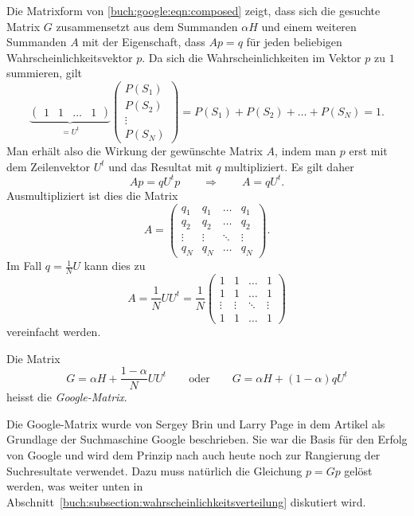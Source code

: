 Die Matrixform von
\eqref{buch:google:eqn:composed}
zeigt, dass sich die gesuchte Matrix $G$ zusammensetzt aus dem Summanden
$\alpha H$ und einem weiteren Summanden $A$ mit der Eigenschaft, dass
$Ap = q$ für jeden beliebigen Wahrscheinlichkeitsvektor $p$.
Da sich die Wahrscheinlichkeiten im Vektor $p$ zu $1$ summieren, gilt
\[
\underbrace{
\begin{pmatrix}
1&1&\dots&1
\end{pmatrix}
}_{\displaystyle = U^t}
\begin{pmatrix}
P(S_1)\\
P(S_2)\\
\vdots\\
P(S_N)
\end{pmatrix}
=
P(S_1)+P(S_2)+\dots+P(S_N)=1.
\]
Man erhält also die Wirkung der gewünschte Matrix $A$, indem man $p$
erst mit dem Zeilenvektor $U^t$ und das Resultat mit $q$ multipliziert.
Es gilt daher
\[
Ap = qU^tp
\qquad\Rightarrow\qquad
A=qU^t.
\]
Ausmultipliziert ist dies die Matrix
\[
A=\begin{pmatrix}
q_1&q_1&\dots&q_1\\
q_2&q_2&\dots&q_2\\
\vdots&\vdots&\ddots&\vdots\\
q_N&q_N&\dots&q_N
\end{pmatrix}.
\]
Im Fall $q=\frac1NU$ kann dies zu
\[
A
=
\frac1N UU^t
=
\frac1N
\begin{pmatrix}
1&1&\dots&1\\
1&1&\dots&1\\
\vdots&\vdots&\ddots&\vdots\\
1&1&\dots&1
\end{pmatrix}
\]
vereinfacht werden.

\begin{definition}
Die Matrix
\begin{equation}
G
=
\alpha H
+
\frac{1-\alpha}{N}
UU^t
\qquad\text{oder}\qquad
G
=
\alpha H
+
(1-\alpha)qU^t
\label{buch:wahrscheinlichkeit:eqn:google-matrix}
\end{equation}
heisst die
{\em Google-Matrix}.
%
\end{definition}

Die Google-Matrix wurde von Sergey Brin und Larry Page 
%
%
in dem Artikel \cite{BRIN1998107} als Grundlage der Suchmaschine
Google beschrieben.
Sie war die Basis für den Erfolg von Google und wird dem Prinzip nach
auch heute noch zur Rangierung der Suchresultate verwendet.
Dazu muss natürlich die Gleichung $p=Gp$ gelöst werden, was
weiter unten in Abschnitt~\ref{buch:subsection:wahrscheinlichkeitsverteilung}
diskutiert wird.

